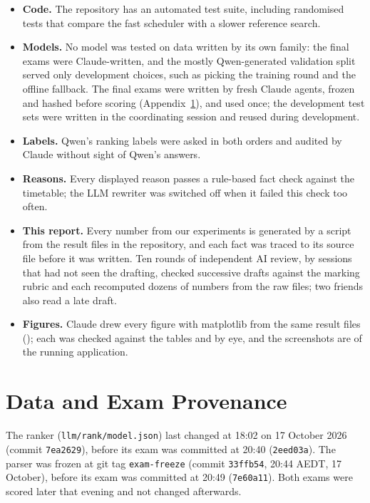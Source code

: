 \begin{itemize}[leftmargin=*]
	\item \textbf{Code.} The repository has an automated test suite, including randomised tests that compare the fast scheduler with a slower reference search.
	\item \textbf{Models.} No model was tested on data written by its own family: the final exams were Claude-written, and the mostly Qwen-generated validation split served only development choices, such as picking the training round and the offline fallback. The final exams were written by fresh Claude agents, frozen and hashed before scoring (Appendix~\ref{app:provenance}), and used once; the development test sets were written in the coordinating session and reused during development.
	\item \textbf{Labels.} Qwen's ranking labels were asked in both orders and audited by Claude without sight of Qwen's answers.
	\item \textbf{Reasons.} Every displayed reason passes a rule-based fact check against the timetable; the LLM rewriter was switched off when it failed this check too often.
	\item \textbf{This report.} Every number from our experiments is generated by a script from the result files in the repository, and each fact was traced to its source file before it was written. Ten rounds of independent AI review, by sessions that had not seen the drafting, checked successive drafts against the marking rubric and each recomputed dozens of numbers from the raw files; two friends also read a late draft.
	\item \textbf{Figures.} Claude drew every figure with matplotlib from the same result files (); each was checked against the tables and by eye, and the screenshots are of the running application.
\end{itemize}

\section{Data and Exam Provenance}\label{app:provenance}

The ranker (\texttt{llm/rank/model.json}) last changed at 18:02 on 17 October 2026 (commit \texttt{7ea2629}), before its exam was committed at 20:40 (\texttt{2eed03a}). The parser was frozen at git tag \texttt{exam-freeze} (commit \texttt{33ffb54}, 20:44 AEDT, 17 October), before its exam was committed at 20:49 (\texttt{7e60a11}). Both exams were scored later that evening and not changed afterwards.

